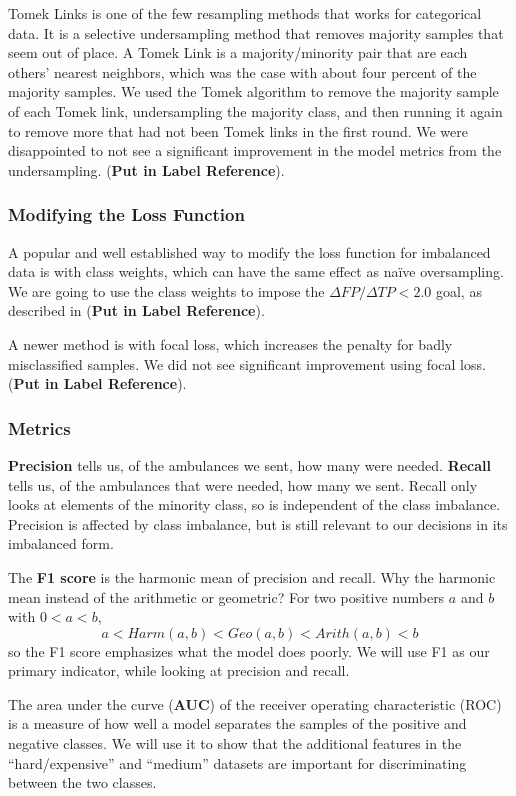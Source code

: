 Tomek Links is one of the few resampling methods that works for categorical data.  It is a selective undersampling method that removes majority samples that seem out of place.  A Tomek Link is a majority/minority pair that are each others' nearest neighbors, which was the case with about four percent of the majority samples.  We used the Tomek algorithm to remove the majority sample of each Tomek link, undersampling the majority class, and then running it again to remove more that had not been Tomek links in the first round.   We were disappointed to not see a significant improvement in the model metrics from the undersampling.  ({\bf Put in Label Reference}).

\subsubsection{Modifying the Loss Function}

A popular and well established way to modify the loss function for imbalanced data is with class weights, which can have the same effect as na{\"i}ve oversampling.  We are going to use the class weights to impose the $\Delta FP/\Delta TP < 2.0$ goal, as described in ({\bf Put in Label Reference}).

A newer method is with focal loss, which increases the penalty for badly misclassified samples. \citep{lin2017focal}  We did not see significant improvement using focal loss.  ({\bf Put in Label Reference}).

\subsubsection{Metrics}

{\bf Precision} tells us, of the ambulances we sent, how many were needed.  {\bf Recall} tells us, of the ambulances that were needed, how many we sent.  Recall only looks at elements of the minority class, so is independent of the class imbalance.  Precision is affected by class imbalance, but is still relevant to our decisions in its imbalanced form.

The {\bf F1 score} is the harmonic mean of precision and recall. Why the harmonic mean instead of the arithmetic or geometric?  For two positive numbers $a$ and $b$ with $0 < a < b$, 
$$a < Harm(a,b) < Geo(a,b) < Arith(a,b) < b$$
so the F1 score emphasizes what the model does poorly.  We will use F1 as our primary indicator, while looking at precision and recall.  

The area under the curve ({\bf AUC}) of the receiver operating characteristic (ROC) is a measure of how well a model separates the samples of the positive and negative classes.  We will use it to show that the additional features in the ``hard/expensive'' and ``medium'' datasets are important for discriminating between the two classes.  

